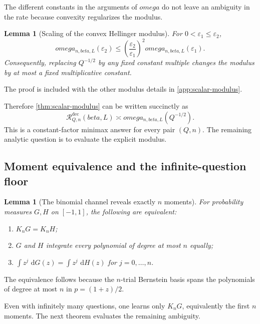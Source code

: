 \documentclass[11pt]{article}
\def\beta{beta}%
\def\omega{omega}%
\newtheorem{lemma}[theorem]{Lemma}
\newcommand{\calR}{\mathcal R}
\newcommand{\eps}{\varepsilon}
\newcommand{\dd}{\,\mathrm d}
\begin{document}
The different constants in the arguments of $\omega$ do not leave an ambiguity in the rate because convexity regularizes the modulus.

\begin{lemma}[Scaling of the convex Hellinger modulus]
\label{lem:modulus-scaling}
For $0<\eps_1\le\eps_2$,
\begin{equation}
\label{eq:modulus-scaling}
\omega_{n,\beta,L}(\eps_2)
\le
\left(\frac{\eps_2}{\eps_1}\right)^2
\omega_{n,\beta,L}(\eps_1).
\end{equation}
Consequently, replacing $Q^{-1/2}$ by any fixed constant multiple changes the modulus by at most a fixed multiplicative constant.
\end{lemma}
The proof is included with the other modulus details in \cref{app:scalar-modulus}.

Therefore \cref{thm:scalar-modulus} can be written succinctly as
\begin{equation}
\label{eq:scalar-modulus-succinct}
\boxed{
\calR^{\mathrm{dec}}_{Q,n}(\beta,L)
\asymp
\omega_{n,\beta,L}(Q^{-1/2}).
}
\end{equation}
This is a constant-factor minimax answer for every pair $(Q,n)$.  The remaining analytic question is to evaluate the explicit modulus.

\subsection{Moment equivalence and the infinite-question floor}

\begin{lemma}[The binomial channel reveals exactly $n$ moments]
\label{lem:moment-equivalence}
For probability measures $G,H$ on $[-1,1]$, the following are equivalent:
\begin{enumerate}[label=(\alph*)]
\item $K_nG=K_nH$;
\item $G$ and $H$ integrate every polynomial of degree at most $n$ equally;
\item $\int z^j\,\dd G(z)=\int z^j\,\dd H(z)$ for $j=0,\dots,n$.
\end{enumerate}
\end{lemma}
The equivalence follows because the $n$-trial Bernstein basis spans the polynomials of degree at most $n$ in $p=(1+z)/2$.

Even with infinitely many questions, one learns only $K_nG$, equivalently the first $n$ moments.  The next theorem evaluates the remaining ambiguity.
\end{document}
